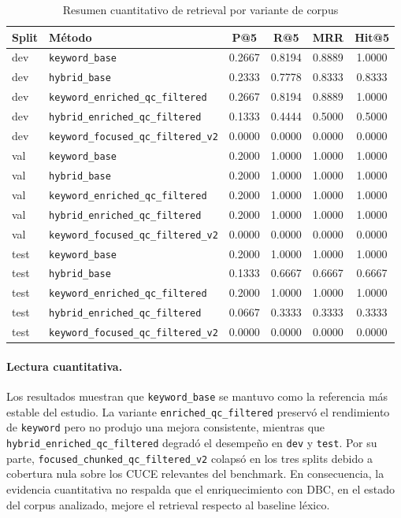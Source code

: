 \begin{table}[ht]
\centering
\caption{Resumen cuantitativo de retrieval por variante de corpus}
\label{tab:resumen-cuantitativo-retrieval}
\begin{tabular}{l l c c c c}
\hline
\textbf{Split} & \textbf{Método} & \textbf{P@5} & \textbf{R@5} & \textbf{MRR} & \textbf{Hit@5} \\
\hline
dev & \texttt{keyword\_base} & 0.2667 & 0.8194 & 0.8889 & 1.0000 \\
dev & \texttt{hybrid\_base} & 0.2333 & 0.7778 & 0.8333 & 0.8333 \\
dev & \texttt{keyword\_enriched\_qc\_filtered} & 0.2667 & 0.8194 & 0.8889 & 1.0000 \\
dev & \texttt{hybrid\_enriched\_qc\_filtered} & 0.1333 & 0.4444 & 0.5000 & 0.5000 \\
dev & \texttt{keyword\_focused\_qc\_filtered\_v2} & 0.0000 & 0.0000 & 0.0000 & 0.0000 \\
\hline
val & \texttt{keyword\_base} & 0.2000 & 1.0000 & 1.0000 & 1.0000 \\
val & \texttt{hybrid\_base} & 0.2000 & 1.0000 & 1.0000 & 1.0000 \\
val & \texttt{keyword\_enriched\_qc\_filtered} & 0.2000 & 1.0000 & 1.0000 & 1.0000 \\
val & \texttt{hybrid\_enriched\_qc\_filtered} & 0.2000 & 1.0000 & 1.0000 & 1.0000 \\
val & \texttt{keyword\_focused\_qc\_filtered\_v2} & 0.0000 & 0.0000 & 0.0000 & 0.0000 \\
\hline
test & \texttt{keyword\_base} & 0.2000 & 1.0000 & 1.0000 & 1.0000 \\
test & \texttt{hybrid\_base} & 0.1333 & 0.6667 & 0.6667 & 0.6667 \\
test & \texttt{keyword\_enriched\_qc\_filtered} & 0.2000 & 1.0000 & 1.0000 & 1.0000 \\
test & \texttt{hybrid\_enriched\_qc\_filtered} & 0.0667 & 0.3333 & 0.3333 & 0.3333 \\
test & \texttt{keyword\_focused\_qc\_filtered\_v2} & 0.0000 & 0.0000 & 0.0000 & 0.0000 \\
\hline
\end{tabular}
\end{table}

\paragraph{Lectura cuantitativa.}
Los resultados muestran que \texttt{keyword\_base} se mantuvo como la referencia más estable del estudio. La variante \texttt{enriched\_qc\_filtered} preservó el rendimiento de \texttt{keyword} pero no produjo una mejora consistente, mientras que \texttt{hybrid\_enriched\_qc\_filtered} degradó el desempeño en \texttt{dev} y \texttt{test}. Por su parte, \texttt{focused\_chunked\_qc\_filtered\_v2} colapsó en los tres splits debido a cobertura nula sobre los CUCE relevantes del benchmark. En consecuencia, la evidencia cuantitativa no respalda que el enriquecimiento con DBC, en el estado del corpus analizado, mejore el retrieval respecto al baseline léxico.
